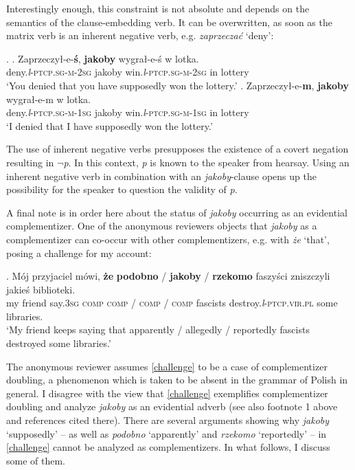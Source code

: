 \documentclass[output=paper
,modfonts
,nonflat]{langsci/langscibook}
\newcommand{\glossformat}[1]{\textsc{#1}}
\newcommand{\firstperson}{\glossformat{1}\xspace}
\newcommand{\secondperson}{\glossformat{2}\xspace}
\newcommand{\thirdperson}{\glossformat{3}\xspace}
\newcommand{\comp}{\glossformat{comp}\xspace}
\newcommand{\lptcp}{\emph{l}\glossformat{-ptcp}\xspace}
\newcommand{\masc}{\glossformat{m}\xspace}
\newcommand{\pl}{\glossformat{pl}\xspace}
\newcommand{\sg}{\glossformat{sg}\xspace}
\newcommand{\vir}{\glossformat{vir}\xspace}
\begin{document}
Interestingly enough, this constraint is not absolute and depends on the semantics of the clause-embedding verb. It can be overwritten, as soon as the matrix verb is an inherent negative verb, e.g. \emph{zaprzeczać} `deny':

 \ex.		\ag.	Zaprzeczył-e-\textbf{ś}, \textbf{jakoby} wygrał-e-ś w lotka.\\
  			deny.{\lptcp}.{\sg}-{\masc}-{\secondperson}{\sg} jakoby win.{\lptcp}.{\sg}-{\masc}-{\secondperson}{\sg} in lottery \\
			 `You denied that you have supposedly won the lottery.'
		\bg.	Zaprzeczył-e-\textbf{m}, \textbf{jakoby} wygrał-e-m w lotka.\\
  			deny.{\lptcp}.{\sg}-{\masc}-{\firstperson}{\sg} jakoby win.{\lptcp}.{\sg}-{\masc}-{\firstperson}{\sg} in lottery \\
			 `I denied that I have supposedly won the lottery.'

The use of inherent negative verbs presupposes the existence of a covert negation resulting in $\lnot$\emph{p}. In this context, \emph{p} is known to the speaker from hearsay. Using an inherent negative verb in combination with an \emph{jakoby}-clause opens up the possibility for the speaker to question the validity of \emph{p}.

A final note is in order here about the status of \emph{jakoby} occurring as an evidential complementizer. One of the anonymous reviewers objects that \emph{jakoby} as a complementizer can co-occur with other complementizers, e.g. with \emph{że} `that', posing a challenge for my account:

\exg.		Mój przyjaciel mówi, \textbf{że} \textbf{podobno} / \textbf{jakoby} / \textbf{rzekomo} faszyści zniszczyli jakieś biblioteki.  \label{challenge} \\
		my friend say.{\thirdperson}{\sg} {\comp} {\comp} / {\comp} / {\comp}  fascists destroy.{\lptcp}.{\vir}.{\pl} some libraries. \\
		 `My friend keeps saying that apparently / allegedly / reportedly fascists destroyed some libraries.'

The anonymous reviewer assumes \ref{challenge} to be a case of complementizer doubling, a phenomenon which is taken to be absent in the grammar of Polish in general. I disagree with the view that \ref{challenge} exemplifies complementizer doubling and analyze \emph{jakoby}  as an evidential adverb (see also footnote 1 above and references cited there). There are several arguments showing why \emph{jakoby}  `supposedly' – as well as \emph{podobno} `apparently' and \emph{rzekomo} `reportedly' – in \ref{challenge} cannot be analyzed as  complementizers. In what follows, I discuss some of them. 
\end{document}
